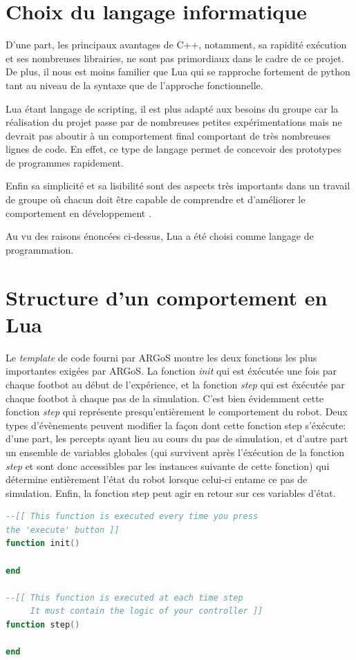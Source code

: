 \section{Choix du langage informatique}

D'une part, les principaux avantages de C++, notamment, sa rapidité exécution et ses nombreuses librairies, ne sont pas primordiaux dans le cadre de ce projet. De plus, il nous est moins familier que Lua qui se rapproche fortement de python tant au niveau de la syntaxe que de l'approche fonctionnelle.

Lua étant langage de scripting, il est plus adapté aux besoins du groupe car la réalisation du projet passe par de nombreuses petites expérimentations mais ne devrait pas aboutir à un comportement final comportant de très nombreuses lignes de code. En effet, ce type de langage permet de concevoir des prototypes de programmes rapidement.

Enfin sa simplicité et sa lisibilité sont des aspects très importants dans un travail de groupe où chacun doit être capable de comprendre et d'améliorer le comportement en développement \cite{compC++,compLua}.

Au vu des raisons énoncées ci-dessus, Lua a été choisi comme langage de programmation.

\section{Structure d'un comportement en Lua}

Le \emph{template} de code fourni par ARGoS montre les deux fonctions les plus importantes exigées par ARGoS. La fonction \emph{init} qui est éxécutée une fois par chaque footbot au début de l'expérience, et la fonction \emph{step} qui est éxécutée par chaque footbot à chaque pas de la simulation. C'est bien évidemment cette fonction \emph{step} qui représente presqu'entièrement le comportement du robot. Deux types d'évènements peuvent modifier la façon dont cette fonction step s'éxécute: d'une part, les percepts ayant lieu au cours du pas de simulation, et d'autre part un ensemble de variables globales (qui survivent après l'éxécution de la fonction \emph{step} et sont donc accessibles par les instances suivante de cette fonction) qui détermine entièrement l'état du robot lorsque celui-ci entame ce pas de simulation. Enfin, la fonction step peut agir en retour sur ces variables d'état.~\cite{argosSite1}
\begin{lstlisting}[language=Lua,frame=single, caption=Structure de base d'un comportement en Lua]
--[[ This function is executed every time you press 
the 'execute' button ]]
function init()

end

--[[ This function is executed at each time step
     It must contain the logic of your controller ]]
function step()

end
\end{lstlisting}
